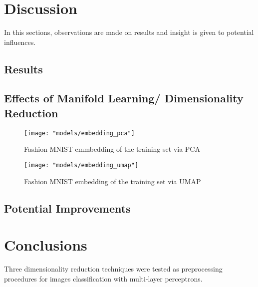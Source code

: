\documentclass[conference]{IEEEtran}
\begin{document}

\section{Discussion} \label{Discussion}
In this sections, observations are made on results and insight is given to potential influences.

\subsection{Results}

\subsection{Effects of Manifold Learning/ Dimensionality Reduction}

\begin{center}
	\begin{figure}[t]
		\centering
		\texttt{[image: "models/embedding\_pca"]}
		\caption{Fashion MNIST emmbedding of the training set via PCA}
		\label{fig:pca_embedding}
	\end{figure}
\end{center}

\begin{center}
	\begin{figure}[t]
		\centering
		\texttt{[image: "models/embedding\_umap"]}
		\caption{Fashion MNIST embedding of the training set via UMAP}
		\label{fig:umap_embedding}
	\end{figure}
\end{center}

\subsection{Potential Improvements}






\section{Conclusions} \label{Conclusions}
Three dimensionality reduction techniques were tested as preprocessing procedures for images classification with multi-layer perceptrons.
\end{document}
